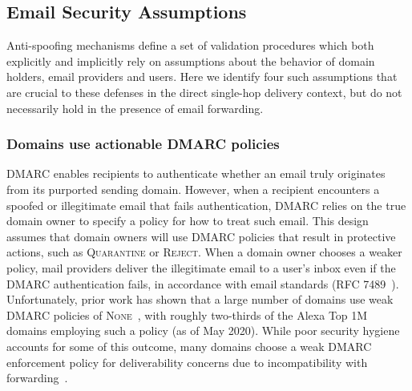 \subsection{Email Security Assumptions}
\label{subsec:assumptions}
Anti-spoofing mechanisms define a set of validation procedures which
both explicitly and implicitly rely on assumptions about the behavior
of domain holders, email providers and users.  Here we identify four
such assumptions that are crucial to these defenses in the direct
single-hop delivery context, but do not necessarily hold in the
presence of email forwarding.




\subsubsection{Domains use actionable DMARC policies}
\label{subsubsec:dmarc_none}
DMARC enables recipients to authenticate whether an email truly
originates from its purported sending domain.  However, when a
recipient encounters a spoofed or illegitimate email that fails
authentication, DMARC relies on the true domain owner to specify a
policy for how to treat such email.  This design assumes that domain
owners will use DMARC policies that result in protective
actions, such as \textsc{Quarantine} or \textsc{Reject}.  When a
domain owner chooses a weaker policy, mail providers deliver the
illegitimate email to a user's inbox even if the DMARC authentication
fails, in accordance with email standards (RFC 7489~\cite{rfc7489}).
Unfortunately, prior work has shown that a large number of domains use
weak DMARC policies of
\textsc{None}~\cite{hu_end--end_nodate,tatang2021evolution,hutowardsunderstanding,
  secplaintxt, maroofi2020defensive, adoptionofschemes}, with roughly
two-thirds of the Alexa Top 1M domains employing such a policy (as of
May 2020).  While poor security hygiene accounts for some of this
outcome, many domains choose a weak DMARC enforcement policy for
deliverability concerns due to incompatibility with forwarding~\cite{hutowardsunderstanding}.

